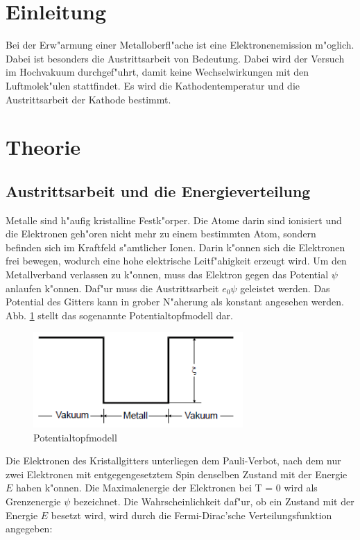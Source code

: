\section{Einleitung} %
\label{sec:einleitung}

Bei der Erw"armung einer Metalloberfl"ache ist eine Elektronenemission m"oglich.
Dabei ist besonders die Austrittsarbeit von Bedeutung.
Dabei wird der Versuch im Hochvakuum durchgef"uhrt, damit keine Wechselwirkungen mit den Luftmolek"ulen stattfindet.
Es wird die Kathodentemperatur und die Austrittsarbeit der Kathode bestimmt.

\section{Theorie} %
\label{sec:theorie}

\subsection{Austrittsarbeit und die Energieverteilung} %
\label{sub:austrittsarbeit_und_die_energieverteilung}

Metalle sind h"aufig kristalline Festk"orper.
Die Atome darin sind ionisiert und die Elektronen geh"oren nicht mehr zu einem bestimmten Atom, sondern befinden sich im Kraftfeld s"amtlicher Ionen.
Darin k"onnen sich die Elektronen frei bewegen, wodurch eine hohe elektrische Leitf"ahigkeit erzeugt wird.
Um den Metallverband verlassen zu k"onnen, muss das Elektron gegen das Potential $\psi$ anlaufen k"onnen.
Daf"ur muss die Austrittsarbeit $e_\mathrm{0}\psi$ geleistet werden.
Das Potential des Gitters kann in grober N"aherung als konstant angesehen werden.
Abb. \ref{potential_topf} stellt das sogenannte Potentialtopfmodell dar.

\begin{figure}[!h]
	\centering
	\includegraphics[width = 8cm]{img/Potentialtopf.PNG}
	\caption{Potentialtopfmodell}
	\label{potential_topf}
\end{figure}

Die Elektronen des Kristallgitters unterliegen dem Pauli-Verbot, nach dem nur zwei Elektronen mit entgegengesetztem Spin denselben Zustand mit der Energie $E$ haben k"onnen.
Die Maximalenergie der Elektronen bei T = 0 wird als Grenzenergie $\psi$ bezeichnet.
Die Wahrscheinlichkeit daf"ur, ob ein Zustand mit der Energie $E$ besetzt wird, wird durch die Fermi-Dirac'sche Verteilungsfunktion angegeben:

